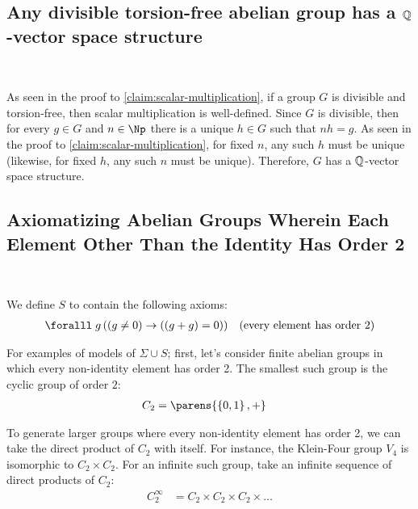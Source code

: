 \subsection{Any divisible torsion-free abelian group has a
\texorpdfstring{$\mathbb{Q}$}{Q}-vector space structure}~\label{sec:torsion-free-q-vector-space}

As seen in the proof to \ref{claim:scalar-multiplication}, if a group $G$
is divisible and torsion-free, then scalar multiplication is well-defined.
Since $G$ is divisible, then for every $g \in G$ and $n \in \Np$
there is a unique $h \in G$ such that $nh = g$.
As seen in the proof to \ref{claim:scalar-multiplication},
for fixed $n$, any such $h$ must be unique
(likewise, for fixed $h$, any such $n$ must be unique).
Therefore, $G$ has a $\mathbb{Q}$-vector space structure.


\bigskip

\subsection{Axiomatizing Abelian Groups Wherein Each Element Other Than the Identity
Has Order 2}~\label{sec:axiomatizing-abelian-groups-order-two}


We define $S$ to contain the following axioms:
\begin{align}
  \forall g\, ( (g \neq 0) \lto ((g + g) &= 0) ) &\text{(every element has order 2)}
\end{align}

\bigskip
For examples of models of $\Sigma \cup S$;
first, let's consider finite abelian groups in which every non-identity
element has order 2.
The smallest such group is the cyclic group of order $2$:
\begin{align*}
  C_2 &= \parens{ \set{0, 1}, + }
\end{align*}

To generate larger groups where every non-identity element has order 2,
we can take the direct product of $C_2$ with itself.
For instance, the Klein-Four group $V_4$ is isomorphic to $C_2 \times C_2$.
For an infinite such group, take an infinite sequence of direct products of $C_2$:
\begin{align*}
  C_2^{\infty} &= C_2 \times C_2 \times C_2 \times \ldots
\end{align*}

